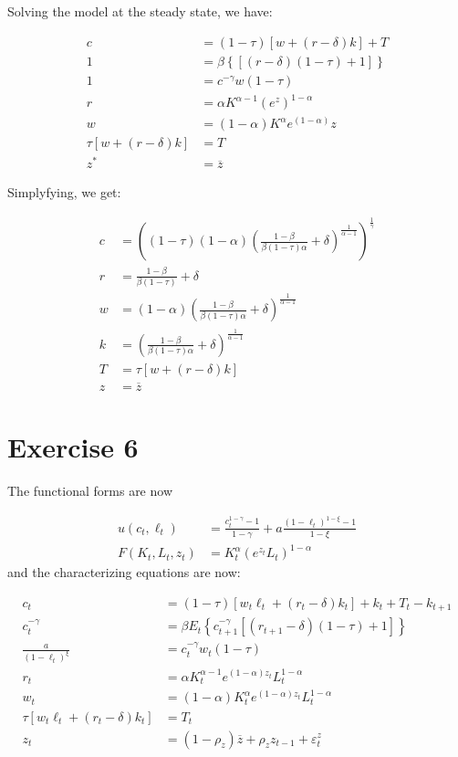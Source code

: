 \documentclass[11pt]{article}
\numberwithin{equation}{section}
\theoremstyle{plain}
\theoremstyle{definition}
\newcommand\parens[1]{\left( #1 \right)}
\newcommand{\1}{\mathbbm 1}
\def\a{\alpha}
\def\b{\beta}
\def\g{\gamma}
\def\d{\delta}
\def\t{\tau}
\newcommand{\e}{\varepsilon}
\begin{document}
Solving the model at the steady state, we have:

\begin{align}
c&=(1-\tau)\left[w+\left(r-\delta\right) k\right]+T \\
1&=\beta \left\{\left[\left(r-\delta\right)(1-\tau)+1\right]\right\} \\
1&=c^{-\g} w(1-\tau) \\
r&=\a K^{\alpha - 1} \parens{e^{z}}^{1-\alpha} \\
w&=(1-\a)K^{\alpha} e^{(1- \alpha)} z \\
\tau\left[w+\left(r-\delta\right) k\right]&=T \\
z^{*}&=\overline{z}
\end{align}

Simplyfying, we get:

\begin{align}
c&= \parens{(1 - \t)(1-\a) \parens{\frac{1-\b}{\b (1 - \t) \a} + \d}^{\frac{1}{\a - 1}}}^{\frac{1}{\g}} \\
r&= \frac{1-\b}{\b (1 - \t)} + \d \\
w&=(1-\a)\parens{\frac{1-\b}{\b (1 - \t) \a} + \d}^{\frac{1}{\a - 1}} \\
k&=\parens{\frac{1-\b}{\b (1 - \t) \a} + \d}^{\frac{1}{\a - 1}} \\
T &=\tau\left[w+\left(r-\delta\right) k\right]\\
z&=\overline{z}
\end{align}

\section*{Exercise 6}

The functional forms are now 

\begin{align} 
 u\left(c_{t}, \ell_{t}\right) &=\frac{c_{t}^{1-\gamma}-1}{1-\gamma}+a \frac{\left(1-\ell_{t}\right)^{1-\xi}-1}{1-\xi} \\ 
  F\left(K_{t}, L_{t}, z_{t}\right) &= K_{t}^{\alpha} \parens{e^{z_{t}} L_{t}}^{1-\alpha} 
 \end{align}
and the characterizing equations are now:

\begin{align}
c_{t}&=(1-\tau)\left[w_{t} \ell_{t}+\left(r_{t}-\delta\right) k_{t}\right]+k_{t}+T_{t}-k_{t+1} \\
c_t^{-\g}&=\beta E_{t}\left\{c_{t+1}^{-\g}\left[\left(r_{t+1}-\delta\right)(1-\tau)+1\right]\right\} \\
\frac{a}{(1-\ell_t)^{\xi}}&=c_t^{-\g} w_{t}(1-\tau) \\
r_{t}&=\a K_{t}^{\alpha - 1} e^{(1-\alpha)z_{t}}L_t^{1-\a}\\
w_{t}&=(1-\a)K_{t}^{\alpha} e^{(1- \alpha) z_{t}}L_t^{1-\a} \\
\tau\left[w_{t} \ell_{t}+\left(r_{t}-\delta\right) k_{t}\right]&=T_t\\
z_t&= (1 - \rho_z) \overline{z} + \rho_z z_{t-1} + \e_t^{z}
\end{align}
\end{document}
